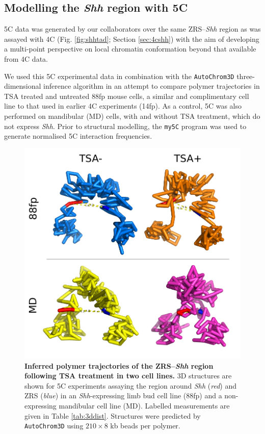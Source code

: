 \documentclass[a4paper,11pt,oneside]{book}
\begin{document}
\subsection{Modelling the \emph{Shh} region with 5C}\label{sec:shh5c}

5C data was generated by our collaborators over the same ZRS--\emph{Shh} region as was assayed with 4C (Fig. \ref{fig:shhtad}; Section \ref{sec:4cshh}) with the aim of developing a multi-point perspective on local chromatin conformation beyond that available from 4C data.

We used this 5C experimental data in combination with the \texttt{AutoChrom3D} three-dimensional inference algorithm\cite{Peng2013} in an attempt to compare polymer trajectories in TSA treated and untreated 88fp mouse cells, a similar and complimentary cell line to that used in earlier 4C experiments (14fp). As a control, 5C was also performed on mandibular (MD) cells, with and without TSA treatment, which do not express \emph{Shh}. Prior to structural modelling, the \texttt{my5C} program was used to generate normalised 5C interaction frequencies.\cite{Lajoie2009a}

\begin{figure}
\begin{center} 
\includegraphics[width=5.45in]{5c3d.pdf}
\captionsetup{width=\textwidth} 
\caption[ Inferred polymer trajectories of the ZRS--\emph{Shh} region following TSA treatment in two cell lines. ]{ {\bf Inferred polymer trajectories of the ZRS--\emph{Shh} region following TSA treatment in two cell lines. }
3D structures are shown for 5C experiments assaying the region around \emph{Shh} (\emph{red}) and ZRS (\emph{blue}) in an \emph{Shh}-expressing limb bud cell line (88fp) and a non-expressing mandibular cell line (MD). Labelled measurements are given in Table \ref{tab:3ddist}. Structures were predicted by \texttt{AutoChrom3D}\cite{Peng2013} using $210 \times 8$ kb beads per polymer.
}\label{fig:5c3d}
\end{center} 
\end{figure} 
\end{document}
